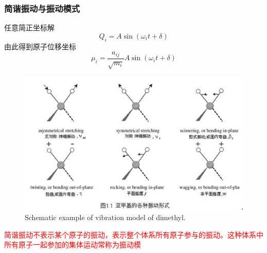 {\frame
{
	\frametitle{简谐振动与振动模式}
	任意简正坐标解
	\begin{displaymath}
		Q_i=A\sin(\omega_it+\delta)
	\end{displaymath}
	由此得到原子位移坐标
	\begin{displaymath}
		\mu_i=\frac{a_{ij}}{\sqrt{m_i}}A\sin(\omega_it+\delta)
	\end{displaymath}
\begin{figure}[h!]
\centering
\vspace*{-0.1in}
\includegraphics[height=1.in,width=2.in,viewport=0 20 420 250,clip]{Figures/RF_vir.jpg}
\caption{\tiny \textrm{Schematic example of vibration model of dimethyl.}}%
\label{virbration_model}
\end{figure} 
\textcolor{red}{简谐振动不表示某个原子的振动，表示整个体系所有原子参与的振动。这种体系中所有原子一起参加的集体运动常称为振动模}
}

}
